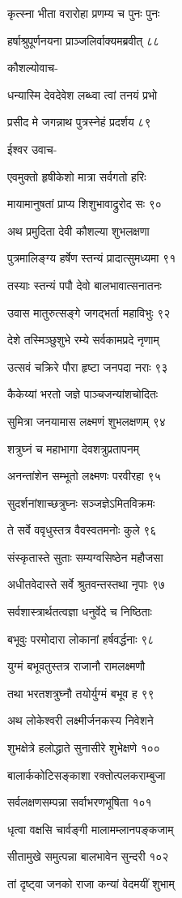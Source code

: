 कृत्स्ना भीता वरारोहा प्रणम्य च पुनः पुनः

हर्षाश्रुपूर्णनयना प्राञ्जलिर्वाक्यमब्रवीत् ८८

कौशल्योवाच-

धन्यास्मि देवदेवेश लब्ध्वा त्वां तनयं प्रभो

प्रसीद मे जगन्नाथ पुत्रस्नेहं प्रदर्शय ८९

ईश्वर उवाच-

एवमुक्तो हृषीकेशो मात्रा सर्वगतो हरिः

मायामानुषतां प्राप्य शिशुभावाद्रुरोद सः ९०

अथ प्रमुदिता देवी कौशल्या शुभलक्षणा

पुत्रमालिङ्ग्य हर्षेण स्तन्यं प्रादात्सुमध्यमा ९१

तस्याः स्तन्यं पपौ देवो बालभावात्सनातनः

उवास मातुरुत्सङ्गे जगद्भर्ता महाविभुः ९२

देशे तस्मिञ्छुशुभे रम्ये सर्वकामप्रदे नृणाम्

उत्सवं चक्रिरे पौरा हृष्टा जनपदा नराः ९३

कैकेय्यां भरतो जज्ञे पाञ्चजन्यांशचोदितः

सुमित्रा जनयामास लक्ष्मणं शुभलक्षणम् ९४

शत्रुघ्नं च महाभागा देवशत्रुप्रतापनम्

अनन्तांशेन सम्भूतो लक्ष्मणः परवीरहा ९५

सुदर्शनांशाच्छत्रुघ्नः सञ्जज्ञेऽमितविक्रमः

ते सर्वे ववृधुस्तत्र वैवस्वतमनोः कुले ९६

संस्कृतास्ते सुताः सम्यग्वसिष्ठेन महौजसा

अधीतवेदास्ते सर्वे श्रुतवन्तस्तथा नृपाः ९७

सर्वशास्त्रार्थतत्वज्ञा धनुर्वेदे च निष्ठिताः

बभूवुः परमोदारा लोकानां हर्षवर्द्धनाः ९८

युग्मं बभूवतुस्तत्र राजानौ रामलक्ष्मणौ

तथा भरतशत्रुघ्नौ तयोर्युग्मं बभूव ह ९९

अथ लोकेश्वरी लक्ष्मीर्जनकस्य निवेशने

शुभक्षेत्रे हलोद्धाते सुनासीरे शुभेक्षणे १००

बालार्ककोटिसङ्काशा रक्तोत्पलकराम्बुजा

सर्वलक्षणसम्पन्ना सर्वाभरणभूषिता १०१

धृत्वा वक्षसि चार्वङ्गी मालामम्लानपङ्कजाम्

सीतामुखे समुत्पन्ना बालभावेन सुन्दरी १०२

तां दृष्ट्वा जनको राजा कन्यां वेदमयीं शुभाम्

